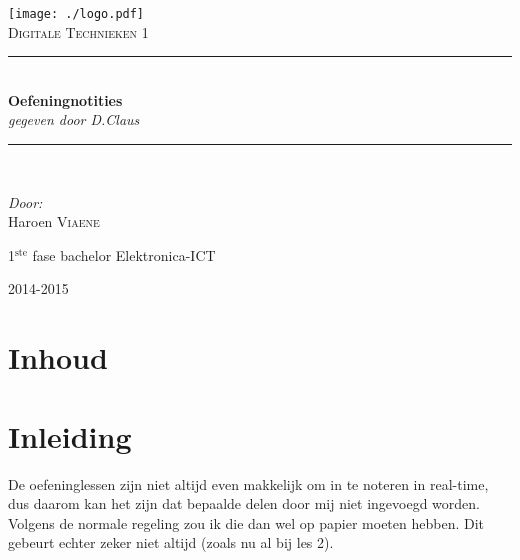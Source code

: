 \documentclass[11pt, a4paper]{article}
\newcommand{\HRule}{\rule{\linewidth}{0.5mm}}
\begin{document}
\begin{titlepage}
\begin{center}
\texttt{[image: ./logo.pdf]}~\\[1cm]


\textsc{\Large Digitale Technieken 1}\\[0.5cm]

\HRule \\[0.4cm]
{ \LARGE \bfseries Oefeningnotities}\\[0.4cm]
{\large \textit{gegeven door D.Claus}}\\[0.2cm]

\HRule \\[1.5cm]

\begin{minipage}{0.4\textwidth}
\begin{flushleft} \large
\emph{Door: }\\
Haroen \textsc{Viaene}\\

\end{flushleft}
\end{minipage}
\begin{minipage}{0.4\textwidth}
\begin{flushright} \large
\large{1$^{\text{ste}}$ fase bachelor Elektronica-ICT}\\
\end{flushright}
\end{minipage}

\vfill

{\large 2014-2015}

\end{center}
\end{titlepage}

\newpage

\section*{Inhoud}

\tableofcontents

\newpage

\section{Inleiding}

De oefeninglessen zijn niet altijd even makkelijk om in te noteren in real-time, dus daarom kan het zijn dat bepaalde delen door mij niet ingevoegd worden. Volgens de normale regeling zou ik die dan wel op papier moeten hebben. Dit gebeurt echter zeker niet altijd (zoals nu al bij les 2).
\end{document}
